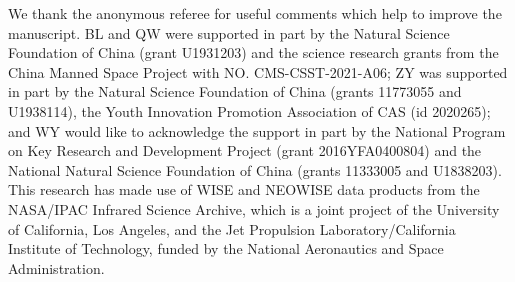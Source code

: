 \documentclass[linenumbers]{aastex631}
\newcommand{\maxi}{{\small \it MAXI}}
\newcommand{\uvot}{{\small {\it Swift}/UVOT}}
\begin{document}
\begin{acknowledgments}
We thank the anonymous referee for useful comments which help to
improve the manuscript. BL and QW were supported in part by the Natural Science Foundation of China (grant U1931203) and the science research grants from the China Manned Space Project with NO. CMS-CSST-2021-A06; ZY was supported in part by the Natural Science Foundation of China (grants 11773055 and U1938114), the Youth Innovation Promotion Association of CAS (id 2020265); and WY would like to acknowledge the support in part by the National Program on Key Research and Development Project (grant 2016YFA0400804) and the National Natural Science Foundation of China (grants 11333005 and U1838203).
This research has made use of WISE and NEOWISE data products from the NASA/IPAC Infrared Science Archive, which is a joint project of the University of California, Los Angeles, and the Jet Propulsion Laboratory/California Institute of Technology, funded by the National Aeronautics and Space Administration. 


\end{acknowledgments}

%



\facilities{\textit{WISE}, \uvot\,, ASAS-SN}%

\end{document}
